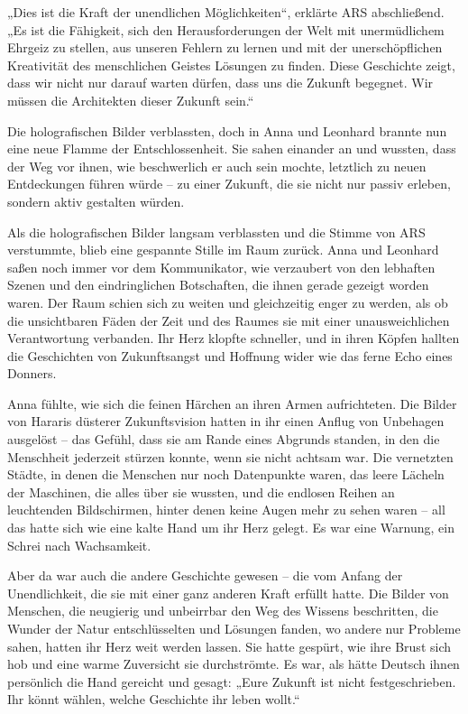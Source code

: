 \documentclass[
]{article}
\begin{document}
„Dies ist die Kraft der unendlichen Möglichkeiten``, erklärte ARS
abschließend. „Es ist die Fähigkeit, sich den Herausforderungen der Welt
mit unermüdlichem Ehrgeiz zu stellen, aus unseren Fehlern zu lernen und
mit der unerschöpflichen Kreativität des menschlichen Geistes Lösungen
zu finden. Diese Geschichte zeigt, dass wir nicht nur darauf warten
dürfen, dass uns die Zukunft begegnet. Wir müssen die Architekten dieser
Zukunft sein.``

Die holografischen Bilder verblassten, doch in Anna und Leonhard brannte
nun eine neue Flamme der Entschlossenheit. Sie sahen einander an und
wussten, dass der Weg vor ihnen, wie beschwerlich er auch sein mochte,
letztlich zu neuen Entdeckungen führen würde -- zu einer Zukunft, die
sie nicht nur passiv erleben, sondern aktiv gestalten würden.

Als die holografischen Bilder langsam verblassten und die Stimme von ARS
verstummte, blieb eine gespannte Stille im Raum zurück. Anna und
Leonhard saßen noch immer vor dem Kommunikator, wie verzaubert von den
lebhaften Szenen und den eindringlichen Botschaften, die ihnen gerade
gezeigt worden waren. Der Raum schien sich zu weiten und gleichzeitig
enger zu werden, als ob die unsichtbaren Fäden der Zeit und des Raumes
sie mit einer unausweichlichen Verantwortung verbanden. Ihr Herz klopfte
schneller, und in ihren Köpfen hallten die Geschichten von Zukunftsangst
und Hoffnung wider wie das ferne Echo eines Donners.

Anna fühlte, wie sich die feinen Härchen an ihren Armen aufrichteten.
Die Bilder von Hararis düsterer Zukunftsvision hatten in ihr einen
Anflug von Unbehagen ausgelöst -- das Gefühl, dass sie am Rande eines
Abgrunds standen, in den die Menschheit jederzeit stürzen konnte, wenn
sie nicht achtsam war. Die vernetzten Städte, in denen die Menschen nur
noch Datenpunkte waren, das leere Lächeln der Maschinen, die alles über
sie wussten, und die endlosen Reihen an leuchtenden Bildschirmen, hinter
denen keine Augen mehr zu sehen waren -- all das hatte sich wie eine
kalte Hand um ihr Herz gelegt. Es war eine Warnung, ein Schrei nach
Wachsamkeit.

Aber da war auch die andere Geschichte gewesen -- die vom Anfang der
Unendlichkeit, die sie mit einer ganz anderen Kraft erfüllt hatte. Die
Bilder von Menschen, die neugierig und unbeirrbar den Weg des Wissens
beschritten, die Wunder der Natur entschlüsselten und Lösungen fanden,
wo andere nur Probleme sahen, hatten ihr Herz weit werden lassen. Sie
hatte gespürt, wie ihre Brust sich hob und eine warme Zuversicht sie
durchströmte. Es war, als hätte Deutsch ihnen persönlich die Hand
gereicht und gesagt: „Eure Zukunft ist nicht festgeschrieben. Ihr könnt
wählen, welche Geschichte ihr leben wollt.``
\end{document}
